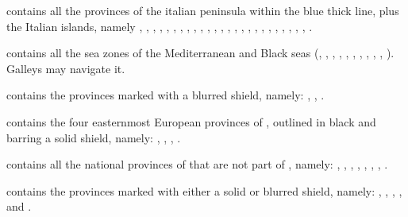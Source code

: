\begin{deflist}
\item[\anchorregion{Italie}] contains all the provinces of the italian
  peninsula within the blue thick line, plus the Italian islands, namely
  , , ,
  , , ,
  , , , ,
  , , , ,
  , , , ,
  , , ,
  , , ,
  , .
\item[\anchorregion{Mediterranee}] contains all the sea zones of the
  Mediterranean and Black seas (, ,
  , , \seazoneLevantin,
  , , ,
  \seazoneGabes, , \seazoneAlboran). Galleys may
  navigate it.
\item[\anchorregion{Norvege}] contains the provinces marked with a blurred
   shield, namely: ,
  , .
\item[\anchorregion{Perse}] contains the four easternmost European provinces
  of , outlined in black and barring a solid 
  shield, namely: , , ,
  .
\item[\anchorregion{Suede}] contains all the national provinces of
   that are not part of , namely:
  , , ,
  , , ,
  , .
\item[\anchorregion{Ukraine}] contains the provinces marked with either a
  solid or blurred  shield, namely: ,
  , , ,
   and .
\end{deflist}


